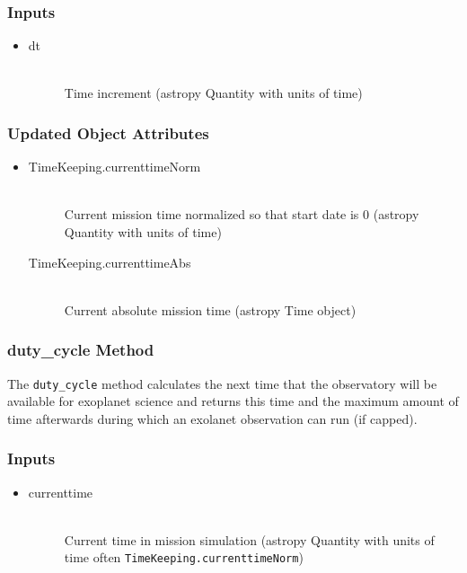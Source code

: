\documentclass[cleanfoot]{asme2ej}
\begin{document}
\subsubsection*{Inputs}
\begin{itemize}
    \item 
    \begin{description}
        \item[dt] \hfill \\
        Time increment (astropy Quantity with units of time)
    \end{description}
\end{itemize}

\subsubsection*{Updated Object Attributes}
\begin{itemize}
    \item 
    \begin{description}
        \item[TimeKeeping.currenttimeNorm] \hfill \\
        Current mission time normalized so that start date is 0 (astropy Quantity with units of time)
        \item[TimeKeeping.currenttimeAbs] \hfill \\
        Current absolute mission time (astropy Time object)
    \end{description}
\end{itemize}

\subsubsection{duty\_cycle Method} \label{sec:dutycycletask}
The \verb+duty_cycle+ method calculates the next time that the observatory will be available for exoplanet science and returns this time and the maximum amount of time afterwards during which an exolanet observation can run (if capped).

\subsubsection*{Inputs}
\begin{itemize}
    \item 
    \begin{description}
        \item[currenttime] \hfill \\
        Current time in mission simulation (astropy Quantity with units of time often \verb+TimeKeeping.currenttimeNorm+)
    \end{description}
\end{itemize}
\end{document}
